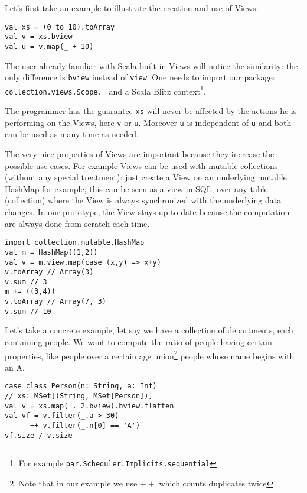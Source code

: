 \documentclass[a4paper,12pt,twocolumn]{article}
\begin{document}
Let's first take an example to illustrate the creation and use of Views:

\begin{lstlisting}
val xs = (0 to 10).toArray
val v = xs.bview
val u = v.map(_ + 10)
\end{lstlisting}

The user already familiar with Scala built-in Views will notice the similarity: the only difference is \verb|bview| instead of \verb|view|.
One needs to import our package: \verb|collection.views.Scope._| and a Scala Blitz context\footnote{For example {\tt par.Scheduler.Implicits.sequential}}.

The programmer has the guarantee \verb|xs| will never be affected by the actions he is performing on the Views, here \verb|v| or \verb|u|.
Moreover \verb|u| is independent of \verb|u| and both can be used as many time as needed.

The very nice properties of Views are important because they increase the possible use cases.
For example Views can be used with mutable collections (without any special treatment): just create a View on an underlying mutable HashMap for example, this can be seen as a view in SQL, over any table (collection) where the View is always synchronized with the underlying data changes.
In our prototype, the View stays up to date because the computation are always done from scratch each time.

\begin{lstlisting}
import collection.mutable.HashMap
val m = HashMap((1,2))
val v = m.view.map(case (x,y) => x+y)
v.toArray // Array(3)
v.sum // 3
m += ((3,4))
v.toArray // Array(7, 3)
v.sum // 10
\end{lstlisting}

Let's take a concrete example, let say we have a collection of departments, each containing people.
We want to compute the ratio of people having certain properties, like people over a certain age union\footnote{Note that in our example we use $++$ which counts duplicates twice} people whose name begins with an A.

\begin{lstlisting}
case class Person(n: String, a: Int)
// xs: MSet[(String, MSet[Person])]
val v = xs.map(_._2.bview).bview.flatten
val vf = v.filter(_.a > 30)
      ++ v.filter(_.n[0] == 'A')
vf.size / v.size
\end{lstlisting}
\end{document}
